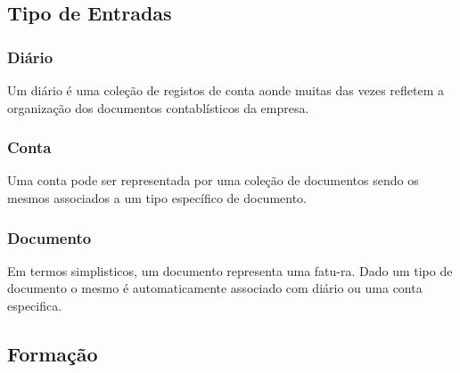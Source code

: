 \documentclass[sigplan]{acmart}
\begin{document}
\subsection{Tipo de Entradas}

\subsubsection{Diário}

Um diário é uma coleção de registos de conta aonde muitas das vezes refletem a organização dos documentos contablísticos da empresa.

\subsubsection{Conta}

Uma conta pode ser representada por uma coleção de documentos sendo os mesmos associados a um tipo específico de documento.

\subsubsection{Documento}

Em termos simplisticos, um documento representa uma fatu-ra. Dado um tipo de documento o mesmo é automaticamente associado com diário ou uma conta especifica.

\subsection{Formação}
\end{document}
